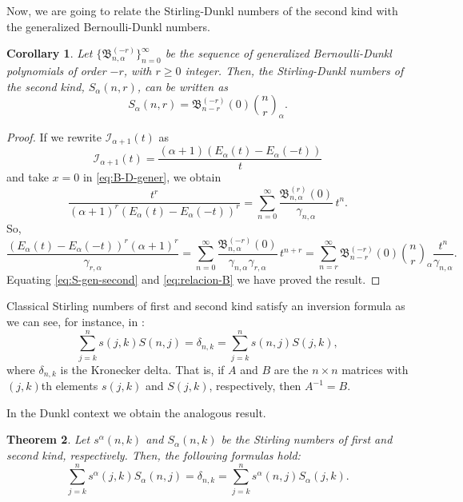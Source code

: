 \documentclass[11pt,a4paper]{article}
\theoremstyle{plain}
\newtheorem{theorem}{Theorem}[section]
\newtheorem{corollary}[theorem]{Corollary}
\theoremstyle{remark}
\newcommand{\I}{\mathcal{I}}
\newcommand{\Ea}{E_{\alpha}}
\newcommand{\binoma}[2]{\binom{#1}{#2}_{\!\alpha}}
\newcommand{\B}{\mathfrak{B}}
\begin{document}
Now, we are going to relate the Stirling-Dunkl numbers of the second kind with the generalized Bernoulli-Dunkl numbers.


\begin{corollary}
Let $\{\B_{n,\alpha}^{(-r)}\}_{n=0}^{\infty}$ be the sequence of generalized Bernoulli-Dunkl polynomials of order $-r$, with $r\ge 0$ integer. Then, the Stirling-Dunkl numbers of the second kind, $S_{\alpha}(n,r)$, can be written as
\[
  S_{\alpha}(n,r) = \B_{n-r}^{(-r)}(0) \binoma{n}{r}.
\]
\end{corollary}

\begin{proof}
If we rewrite $\I_{\alpha+1}(t)$ as
\[
  \I_{\alpha+1}(t) = \frac{(\alpha+1)(\Ea(t)-\Ea(-t))}{t}
\]
and take $x=0$ in \eqref{eq:B-D-gener}, we obtain
\[
  \frac{t^r}{(\alpha+1)^r(\Ea(t)-\Ea(-t))^r}
  = \sum_{n=0}^{\infty} \frac{\B_{n,\alpha}^{(r)}(0)}{\gamma_{n,\alpha}} \,t^n.
\]
So, 
\begin{equation}
\label{eq:relacion-B}
  \frac{(\Ea(t)-\Ea(-t))^r(\alpha+1)^r}{\gamma_{r,\alpha}}
  = \sum_{n=0}^{\infty}\frac{\B_{n,\alpha}^{(-r)}(0)}{\gamma_{n,\alpha}\gamma_{r,\alpha}} \,t^{n+r}
  = \sum_{n=r}^{\infty}\B_{n-r}^{(-r)}(0)\binoma{n}{r}\frac{t^n}{\gamma_{n,\alpha}}.
\end{equation}
Equating \eqref{eq:S-gen-second} and \eqref{eq:relacion-B} we have proved the result.
\end{proof}

Classical Stirling numbers of first and second kind satisfy an inversion formula as we can see, for instance, in \cite[26.8.39]{Br-NIST}: 
\[
  \sum_{j=k}^n s(j,k)S(n,j) = \delta_{n,k} = \sum_{j=k}^n s(n,j)S(j,k),
\]
where $\delta_{n,k}$ is the Kronecker delta. That is, if $A$ and $B$ are the $n \times n$ matrices with $(j,k)$th elements $s(j,k)$ and $S(j,k)$, respectively, then $A^{-1} = B$.

In the Dunkl context we obtain the analogous result.

\begin{theorem}
\label{teo:inversion}
Let $s^{\alpha}(n,k)$ and $S_{\alpha}(n,k)$ be the Stirling numbers of first and second kind, respectively. Then, the following formulas hold: 
\begin{equation}
\label{eq:inversion-Dunkl}
  \sum_{j=k}^n s^{\alpha}(j,k)S_{\alpha}(n,j)
  = \delta_{n,k} = \sum_{j=k}^n s^{\alpha}(n,j)S_{\alpha}(j,k).
\end{equation}
\end{theorem}
\end{document}

